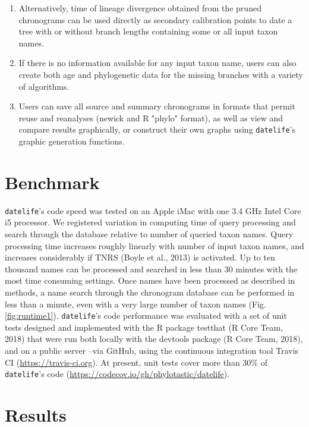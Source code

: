 \documentclass[
  english,
  man]{apa6}
\begin{document}
\begin{enumerate}
<!-- \item  Alternatively, time of lineage divergence obtained from the pruned chronograms can be used directly as secondary calibration points to date a tree with or without branch lengths containing some or all input taxon names. %
\item  If there is no information available for any input taxon name, users can also create both age and phylogenetic data for the missing branches with a variety of algorithms.
\item  Users can save all source and summary chronograms in formats that permit reuse and reanalyses (newick and R "phylo" format), as well as view and compare results graphically, or construct their own graphs using \texttt{datelife}'s graphic generation functions.
\end{enumerate}

\hypertarget{benchmark}{%
\section{Benchmark}\label{benchmark}}

\texttt{datelife}'s code speed was tested on an Apple iMac
with one 3.4 GHz Intel Core i5 processor.
We registered variation in computing time of query processing and search through the database relative to number of queried taxon names.
Query processing time increases roughly linearly with number of input taxon names, and
increases considerably if TNRS (Boyle et al., 2013) is activated.
Up to ten thousand names can be processed and searched in less than 30 minutes with the most time consuming settings.
Once names have been processed as described in methods, a name search through the chronogram database can be performed in less than a minute, even with a very large number of taxon names (Fig. \ref{fig:runtime1}).
\texttt{datelife}'s code performance was evaluated with a set of unit tests designed and
implemented with the R package testthat (R Core Team, 2018) that were run both locally
with the devtools package (R Core Team, 2018), and on a public server --via
GitHub, using the continuous integration tool Travis CI (\url{https://travis-ci.org}). At
present, unit tests cover more than 30\% of \texttt{datelife}'s code (\url{https://codecov.io/gh/phylotastic/datelife}).

\hypertarget{results}{%
\section{Results}\label{results}}
\end{document}
